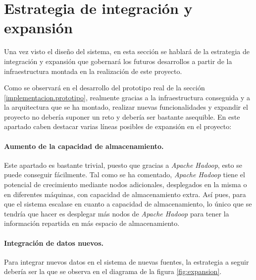 \section{Estrategia de integración y expansión}
\label{disenyo.estrategia}

Una vez visto el diseño del sistema, en esta sección se hablará de la estrategia de integración y expansión que gobernará los futuros desarrollos a partir de la infraestructura montada en la realización de este proyecto. 

Como se observará en el desarrollo del prototipo real de la sección \ref{implementacion.prototipo}, realmente gracias a la infraestructura conseguida y a la arquitectura que se ha montado, realizar nuevas funcionalidades y expandir el proyecto no debería suponer un reto y debería ser bastante asequible. En este apartado caben destacar varias líneas posibles de expansión en el proyecto: 

\paragraph*{Aumento de la capacidad de almacenamiento.} Este apartado es bastante trivial, puesto que gracias a \textit{Apache Hadoop}, esto se puede conseguir fácilmente. Tal como se ha comentado, \textit{Apache Hadoop} tiene el potencial de crecimiento mediante nodos adicionales, desplegados en la misma o en diferentes máquinas, con capacidad de almacenamiento extra. Así pues, para que el sistema escalase en cuanto a capacidad de almacenamiento, lo único que se tendría que hacer es desplegar más nodos de \textit{Apache Hadoop} para tener la información repartida en más espacio de almacenamiento. 

\paragraph*{Integración de datos nuevos.} Para integrar nuevos datos en el sistema de nuevas fuentes, la estrategia a seguir debería ser la que se observa en el diagrama de la figura \ref{fig:expansion}.

